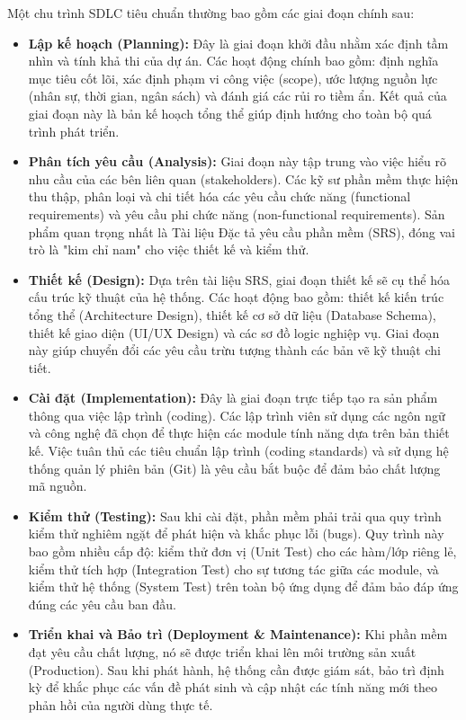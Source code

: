 Một chu trình SDLC tiêu chuẩn thường bao gồm các giai đoạn chính sau:
\begin{itemize}
    \item \textbf{Lập kế hoạch (Planning):} Đây là giai đoạn khởi đầu nhằm xác định tầm nhìn và tính khả thi của dự án. Các hoạt động chính bao gồm: định nghĩa mục tiêu cốt lõi, xác định phạm vi công việc (scope), ước lượng nguồn lực (nhân sự, thời gian, ngân sách) và đánh giá các rủi ro tiềm ẩn. Kết quả của giai đoạn này là bản kế hoạch tổng thể giúp định hướng cho toàn bộ quá trình phát triển.
    \item \textbf{Phân tích yêu cầu (Analysis):} Giai đoạn này tập trung vào việc hiểu rõ nhu cầu của các bên liên quan (stakeholders). Các kỹ sư phần mềm thực hiện thu thập, phân loại và chi tiết hóa các yêu cầu chức năng (functional requirements) và yêu cầu phi chức năng (non-functional requirements). Sản phẩm quan trọng nhất là Tài liệu Đặc tả yêu cầu phần mềm (SRS), đóng vai trò là "kim chỉ nam" cho việc thiết kế và kiểm thử.
    \item \textbf{Thiết kế (Design):} Dựa trên tài liệu SRS, giai đoạn thiết kế sẽ cụ thể hóa cấu trúc kỹ thuật của hệ thống. Các hoạt động bao gồm: thiết kế kiến trúc tổng thể (Architecture Design), thiết kế cơ sở dữ liệu (Database Schema), thiết kế giao diện (UI/UX Design) và các sơ đồ logic nghiệp vụ. Giai đoạn này giúp chuyển đổi các yêu cầu trừu tượng thành các bản vẽ kỹ thuật chi tiết.
    \item \textbf{Cài đặt (Implementation):} Đây là giai đoạn trực tiếp tạo ra sản phẩm thông qua việc lập trình (coding). Các lập trình viên sử dụng các ngôn ngữ và công nghệ đã chọn để thực hiện các module tính năng dựa trên bản thiết kế. Việc tuân thủ các tiêu chuẩn lập trình (coding standards) và sử dụng hệ thống quản lý phiên bản (Git) là yêu cầu bắt buộc để đảm bảo chất lượng mã nguồn.
    \item \textbf{Kiểm thử (Testing):} Sau khi cài đặt, phần mềm phải trải qua quy trình kiểm thử nghiêm ngặt để phát hiện và khắc phục lỗi (bugs). Quy trình này bao gồm nhiều cấp độ: kiểm thử đơn vị (Unit Test) cho các hàm/lớp riêng lẻ, kiểm thử tích hợp (Integration Test) cho sự tương tác giữa các module, và kiểm thử hệ thống (System Test) trên toàn bộ ứng dụng để đảm bảo đáp ứng đúng các yêu cầu ban đầu.
    \item \textbf{Triển khai và Bảo trì (Deployment \& Maintenance):} Khi phần mềm đạt yêu cầu chất lượng, nó sẽ được triển khai lên môi trường sản xuất (Production). Sau khi phát hành, hệ thống cần được giám sát, bảo trì định kỳ để khắc phục các vấn đề phát sinh và cập nhật các tính năng mới theo phản hồi của người dùng thực tế.
\end{itemize}

